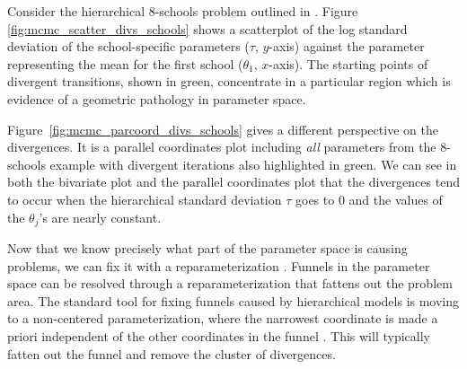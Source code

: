 \documentclass{statsoc}
\begin{document}
Consider the hierarchical 8-schools problem outlined in \citep{rubin1981, gelman2013bda}. 
Figure \ref{fig:mcmc_scatter_divs_schools} shows a scatterplot of the log standard deviation 
of the school-specific parameters ($\tau$, $y$-axis) against the parameter representing the 
mean for the first school ($\theta_1$, $x$-axis). The starting points of divergent transitions, 
shown in green, concentrate in a particular region which is evidence of a geometric 
pathology in parameter space. 

Figure~\ref{fig:mcmc_parcoord_divs_schools}
gives a different perspective on the divergences. It is a parallel coordinates
plot including \emph{all} parameters from the 8-schools example with divergent
iterations also highlighted in green. We can see in both the bivariate plot and
the parallel coordinates plot that the divergences tend to occur when the
hierarchical standard deviation $\tau$ goes to 0 and the values of the
$\theta_j$'s are nearly constant. 

Now that we know precisely what part of the parameter space is causing problems,
we can fix it with a reparameterization \citep{betancourt2015}. Funnels in the parameter 
space can be resolved through a reparameterization that fattens out the problem area. 
The standard tool for fixing funnels caused by hierarchical models is moving to a non-centered
parameterization, where the narrowest coordinate is made a priori independent of
the other coordinates in the funnel \citep{betancourt2015}. This will typically
fatten out the funnel and remove the cluster of divergences.
\end{document}
